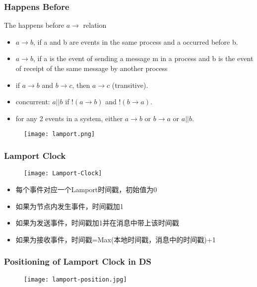 \begin{frame}
    \frametitle{Happens Before}
    \begin{block}{The happens before $ a \to$ relation}
        \begin{itemize}
            \item $a \to b$, if a and b are events in the same process and a occurred before b.
            \item $a \to b$, if a is the event of sending a message m in a process and b is the event of receipt of the same message by another process
            \item if $a \to b$ and $b \to c$, then $a \to c$ (transitive).
            \item concurrent: $ a || b$ if $!(a \to b)$ and $!(b \to a)$.
            \item for any 2 events in a system, either $a \to b$ or $b \to a$ or $a || b$.
        \end{itemize}
    \end{block}
    \begin{figure}
        \centering
        \texttt{[image: lamport.png]}
    \end{figure}
\end{frame}

\begin{frame}
    \frametitle{Lamport Clock}
    \begin{figure}
        \centering
        \texttt{[image: Lamport-Clock]}
    \end{figure}
    \begin{itemize}
        \item 每个事件对应一个Lamport时间戳，初始值为0
        \item 如果为节点内发生事件，时间戳加1
        \item 如果为发送事件，时间戳加1并在消息中带上该时间戳
        \item 如果为接收事件，时间戳=Max(本地时间戳，消息中的时间戳)+1
    \end{itemize}
\end{frame}

\begin{frame}
    \frametitle{Positioning of Lamport Clock in DS}
    \begin{figure}
        \centering
        \texttt{[image: lamport-position.jpg]}
    \end{figure}
\end{frame}

